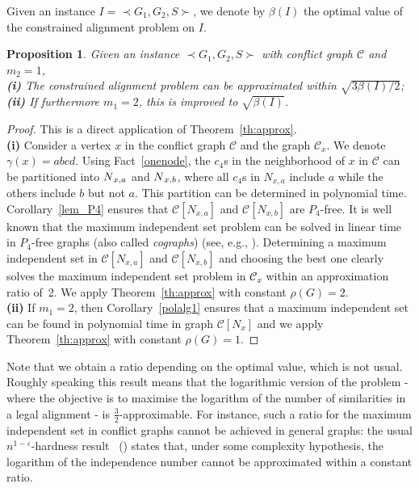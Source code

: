\documentclass[final]{dmtcs-episciences}
\newtheorem{proposition}[theorem]{Proposition}
\newcommand\mar[1]{\textcolor{black}{#1}}
\begin{document}
Given an instance $I=\prec G_1,G_2,S \succ$, we denote by $\beta(I)$ the optimal value of the constrained alignment problem on $I$. 
\begin{proposition}\label{pro:approxsqrt}
Given an instance $\prec G_1,G_2,S \succ$ with conflict graph $\mathcal{C}$ and $m_2=1$,\\
\textbf{(i)} The constrained alignment problem can be approximated within $\sqrt{3\beta(I)/2}$;\\
\textbf{(ii)} If furthermore $m_1=2$, this is improved to  $\sqrt{\beta(I)}$.
\end{proposition}
\begin{proof}



This is a direct application of Theorem~\ref{th:approx}.\\
\textbf{(i)} Consider a vertex $x$ in the conflict graph $\mathcal{C}$ and the graph $\mathcal{C}_x$. We denote $\gamma(x)=abcd$. Using Fact~\ref{onenode},   
the $c_4$s in the neighborhood of $x$ in $\mathcal{C}$ can be partitioned into $\mar{N}_{x,a}$ and $\mar{N}_{x,b}$, where all $c_4$s in $N_{x,a}$ include $a$ while the others include $b$ but not $a$. This partition can be determined in polynomial time.  
Corollary~\ref{lem_P4} ensures that $\mathcal{C}[N_{x,a}]$ and $\mathcal{C}[N_{x,b}]$ are $P_4$-free. It is well known that the maximum independent set problem can be solved in linear time in $P_4$-free graphs (also called {\em cographs}) (see, e.g., \citet{golumbicbook}). Determining a maximum independent set in $\mathcal{C}[N_{x,a}]$ and $\mathcal{C}[N_{x,b}]$ and choosing the best one clearly solves the maximum independent set problem in  \mar{$\mathcal{C}_x$} within an approximation ratio of~2. We apply Theorem~\ref{th:approx} with constant $\rho(G)=2$.\\
\textbf{(ii)} If $m_1=2$, then Corollary~\ref{polalg1} ensures that a maximum independent set can be found in polynomial time in graph $\mathcal{C}[N_{x}]$ and we apply Theorem~\ref{th:approx} with constant $\rho(G)=1$.
\end{proof}

Note that we obtain a ratio depending on the optimal value, which is not usual. Roughly speaking this result means that the logarithmic version of the problem \-- where the objective is to maximise the logarithm of the number of similarities in a legal alignment \-- is $\frac{3}{2}$-approximable. For instance, such a ratio for the maximum independent set in conflict graphs cannot be achieved in general graphs: the usual $n^{1-\varepsilon}$-hardness result~ (\citet{hastad}) states that, under some complexity hypothesis, the logarithm of the independence number cannot be approximated within a constant ratio.
\end{document}
